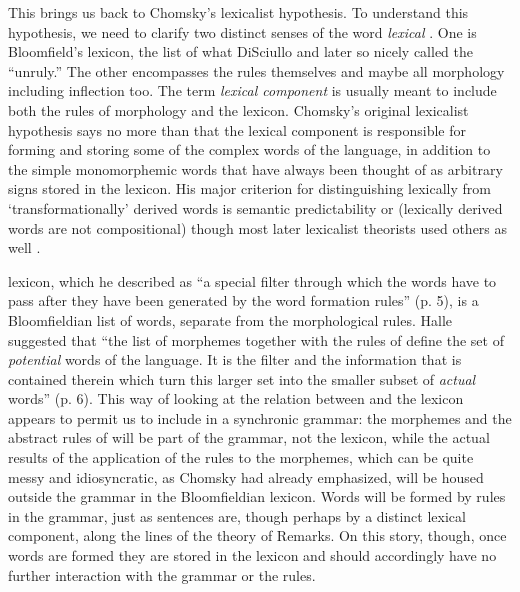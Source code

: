 \documentclass[output=paper]{langsci/langscibook}
\begin{document}
This brings us back to Chomsky's lexicalist hypothesis. To understand
this hypothesis, we need to clarify two distinct senses of the word
\emph{lexical} %
\citep{Aronoff88}%
%
. One is Bloomfield's lexicon, the list of
what DiSciullo and %
\citet{Di-Sciullo87} %
%
later so nicely called the
``unruly.'' The other encompasses the  rules themselves
and maybe all morphology including inflection too. The term
\emph{lexical component} is usually meant to include both the rules of
morphology and the lexicon. Chomsky's original lexicalist hypothesis
says no more than that the lexical component is responsible for forming
and storing some of the complex words of the language, in addition to
the simple monomorphemic words that have always been thought of as
arbitrary signs stored in the lexicon. His major criterion for
distinguishing lexically from `transformationally' derived words is
semantic predictability or  (lexically derived words are
not compositional) though most later lexicalist theorists used others as
well %
\citep{Aronoff94,Pesetsky.1995}%
%
.

%
%
lexicon, which he described as ``a special filter through
which the words have to pass after they have been generated by the word
formation rules'' (p. 5), is a Bloomfieldian list of words, separate
from the morphological rules. Halle suggested that ``the list of
morphemes together with the rules of  define the set of
\emph{potential} words of the language. It is the filter and the
information that is contained therein which turn this larger set into
the smaller subset of \emph{actual} words'' (p. 6). This way of looking
at the relation between  and the lexicon appears to permit
us to include  in a synchronic grammar: the morphemes and
the abstract rules of  will be part of the grammar, not
the lexicon, while the actual results of the application of the rules to
the morphemes, which can be quite messy and idiosyncratic, as Chomsky
had already emphasized, will be housed outside the grammar in the
Bloomfieldian lexicon. Words will be formed by rules in the grammar,
just as sentences are, though perhaps by a distinct lexical component,
along the lines of the theory of Remarks. On this story, though,
once words are formed they are stored in the lexicon and should
accordingly have no further interaction with the grammar or the rules.
\end{document}
